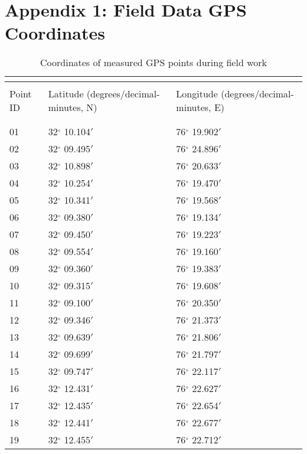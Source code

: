 \section{Appendix 1: Field Data GPS Coordinates}\label{app4}

\begin{ThreePartTable}
	\centering
	\small
	\def\arraystretch{1.5}
	\begin{longtable}{L{2cm} L{6.3cm} L{6.3cm}}
		\caption{Coordinates of measured GPS points during field work}
		\hskip15pt	
		\label{tableApp2}\\
		\toprule[0.25mm]\\[-0.5cm]
		Point ID & Latitude (degrees/decimal-minutes, N) & Longitude (degrees/decimal-minutes, E) \\\\[-0.5cm]
		\midrule[0.35mm]\\[-0.6cm]	
01  &32$^\circ$ 10.104$'$& 76$^\circ$ 19.902$'$ \\
02  &32$^\circ$ 09.495$'$& 76$^\circ$ 24.896$'$ \\
03  &32$^\circ$ 10.898$'$& 76$^\circ$ 20.633$'$\\
04  &32$^\circ$ 10.254$'$& 76$^\circ$ 19.470$'$\\
05  &32$^\circ$ 10.341$'$& 76$^\circ$ 19.568$'$\\
06  & 32$^\circ$ 09.380$'$& 76$^\circ$ 19.134$'$\\
07  & 32$^\circ$ 09.450$'$& 76$^\circ$ 19.223$'$\\
08  & 32$^\circ$ 09.554$'$&  76$^\circ$ 19.160$'$\\
09  & 32$^\circ$ 09.360$'$&  76$^\circ$ 19.383$'$\\
10 &32$^\circ$ 09.315$'$&  76$^\circ$ 19.608$'$\\
11 &   32$^\circ$ 09.100$'$&  76$^\circ$ 20.350$'$\\
12 &32$^\circ$ 09.346$'$&  76$^\circ$ 21.373$'$\\
13 &32$^\circ$ 09.639$'$&  76$^\circ$ 21.806$'$\\
14 &32$^\circ$ 09.699$'$&  76$^\circ$ 21.797$'$\\
15 &32$^\circ$ 09.747$'$&  76$^\circ$ 22.117$'$\\
16 &32$^\circ$ 12.431$'$& 76$^\circ$ 22.627$'$\\
17 &32$^\circ$ 12.435$'$& 76$^\circ$ 22.654$'$\\
18 &32$^\circ$ 12.441$'$& 76$^\circ$ 22.677$'$\\
19 &32$^\circ$ 12.455$'$& 76$^\circ$ 22.712$'$\\

\end{longtable}
\end{ThreePartTable}
